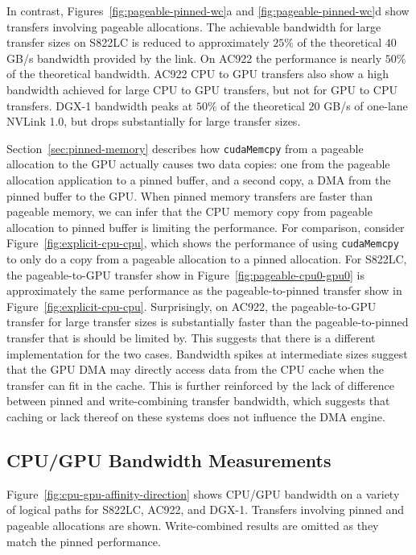 In contrast, Figures~\ref{fig:pageable-pinned-wc}a and \ref{fig:pageable-pinned-wc}d show transfers involving pageable allocations.
The achievable bandwidth for large transfer sizes on S822LC is reduced to approximately $25\%$ of the theoretical $40$ GB/s bandwidth provided by the link.
On AC922 the performance is nearly $50\%$ of the theoretical bandwidth.
AC922 CPU to GPU transfers also show a high bandwidth achieved for large CPU to GPU transfers, but not for GPU to CPU transfers.
DGX-1 bandwidth peaks at $50\%$ of the theoretical $20$ GB/s of one-lane NVLink 1.0, but drops substantially for large transfer sizes.

Section~\ref{sec:pinned-memory} describes how \texttt{cudaMemcpy} from a pageable allocation to the GPU actually causes two data copies: one from the pageable allocation application to a pinned buffer, and a second copy, a DMA from the pinned buffer to the GPU.
When pinned memory transfers are faster than pageable memory, we can infer that the CPU memory copy from pageable allocation to pinned buffer is limiting the performance.
For comparison, consider Figure~\ref{fig:explicit-cpu-cpu}, which shows the performance of using \texttt{cudaMemcpy} to only do a copy from a pageable allocation to a pinned allocation.
For S822LC, the pageable-to-GPU transfer show in Figure~\ref{fig:pageable-cpu0-gpu0} is approximately the same performance as the pageable-to-pinned transfer show in Figure~\ref{fig:explicit-cpu-cpu}.
Surprisingly, on AC922, the pageable-to-GPU transfer for large transfer sizes is substantially faster than the pageable-to-pinned transfer that is should be limited by.
This suggests that there is a different implementation for the two cases.
Bandwidth spikes at intermediate sizes suggest that the GPU DMA may directly access data from the CPU cache when the transfer can fit in the cache.
This is further reinforced by the lack of difference between pinned and write-combining transfer bandwidth, which suggests that caching or lack thereof on these systems does not influence the DMA engine.

\subsection{CPU/GPU Bandwidth Measurements}

Figure~\ref{fig:cpu-gpu-affinity-direction} shows CPU/GPU bandwidth on a variety of logical paths for S822LC, AC922, and DGX-1.
Transfers involving pinned and pageable allocations are shown.
Write-combined results are omitted as they match the pinned performance.

